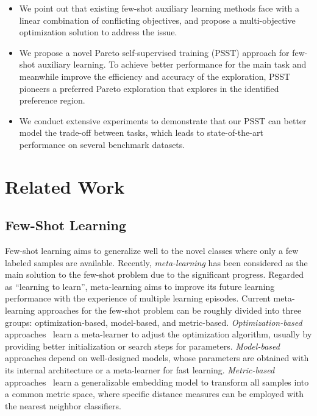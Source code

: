 \documentclass[final]{cvpr}
\begin{document}
\begin{itemize}
	\item We point out that existing few-shot auxiliary learning methods face with a linear combination of conflicting objectives, and propose a multi-objective optimization solution to address the issue.
	\item We propose a novel Pareto self-supervised training (PSST) approach for few-shot auxiliary learning. To achieve better performance for the main task and meanwhile improve the efficiency and accuracy of the exploration, PSST pioneers a preferred Pareto exploration that explores in the identified preference region.
	\item We conduct extensive experiments to demonstrate that our PSST can better model the trade-off between tasks, which leads to state-of-the-art performance on several benchmark datasets.
	
\end{itemize}

  
\section{Related Work}

\subsection{Few-Shot Learning}


Few-shot learning aims to generalize well to the novel classes where only a few labeled samples are available. Recently, \textit{meta-learning} has been considered as the main solution to the few-shot problem due to the significant progress. Regarded as ``learning to learn'', meta-learning aims to improve its future learning performance with the experience of multiple learning episodes. Current meta-learning approaches for the few-shot problem can be roughly divided into three groups: optimization-based, model-based, and metric-based. \textit{Optimization-based} approaches~\cite{chenmu21,ChenWang21,FinnAL17} learn a meta-learner to adjust the optimization algorithm, usually by providing better initialization or search steps for parameters. \textit{Model-based}~\cite{BertinettoHTV19,GidarisK18,GuoC20,MunkhdalaiY17} approaches depend on well-designed models, whose parameters are obtained with its internal architecture or a meta-learner for fast learning. \textit{Metric-based} approaches~\cite{oreshkin2018tadam,SnellSZ17,Sung:RelationNet} learn a generalizable embedding model to transform all samples into a common metric space, where specific distance measures can be employed with the nearest neighbor classifiers.
\end{document}
